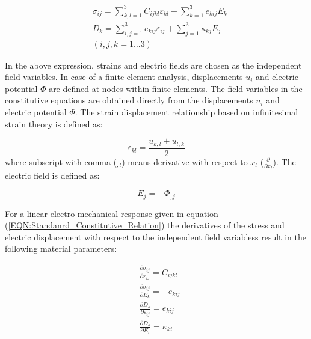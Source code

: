 \begin{equation}
\begin{aligned}
&\sigma _{ij} = 
\sum_{k,l=1}^3 {C_{ijkl}}{\varepsilon _{kl}} - 
\sum_{k=1}^3 {e_{kij}}{E_k}\\
&{D_k} = 
\sum_{i,j=1}^3 e_{kij}\varepsilon _{ij} + 
\sum_{j=1}^3 \kappa _{kj}{E_j}\\
& (i,j,k=1 \dots 3)
\end{aligned}
\label{EQN:Standanrd_Constitutive_Relation}
\end{equation}

In the above expression, strains and electric fields are chosen as the independent field variables. 
In case of a finite element analysis, displacements $u_i$ and electric potential $\Phi$ are defined at nodes within finite elements. 
The field variables in the constitutive equations are obtained directly from the displacements $u_i$ and electric potential $\Phi$. 
The strain displacement relationship based on infinitesimal strain theory is defined as:

\begin{equation}
\varepsilon_{kl}=\frac{u_{k,l}+u_{l,k}}{2}
\label{EQN:Linear_Displacement}
\end{equation}
where subscript with comma ($_{,l}$) means derivative with respect to $x_l$ ($\frac{\partial}{\partial x_l}$). 
The electric field is defined as:

\begin{equation}
E_j=-\Phi_{,j}
\label{EQN:Linear_Electric_Field}
\end{equation}

For a linear electro mechanical response given in equation
(\ref{EQN:Standanrd_Constitutive_Relation}) the derivatives of the stress and
electric displacement with respect to the independent field variabless result in
the following material parameters:

\begin{equation}
\begin{aligned}
&\frac{\partial \sigma_{ij}}{\partial \varepsilon_{kl}}=C_{ijkl} \\
&\frac{\partial \sigma_{ij}}{\partial E_{k}}=-e_{kij} \\
&\frac{\partial D_{k}}{\partial\varepsilon_{ij}}=e_{kij} \\
&\frac{\partial D_{k}}{\partial E_{i}}=\kappa_{ki}
\end{aligned}
\label{EQN:Linear_Constants}
\end{equation}

